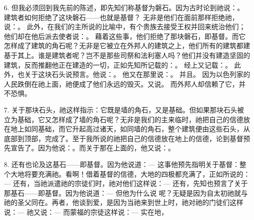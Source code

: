 6. 但我必须回到我先前的陈述，即先知们称基督为磐石。因为古时论到祂说：。建筑者如何拒绝了这块磐石——也就是基督？ 无非是他们在面前那样拒绝祂，说：。 此外，在我们的主所说的比喻中，有个贵族去接受王权并回来统治他们；他们却在他后派去使者说：。 藉着这些事，他们拒绝了那块磐石，即基督。而它怎样成了建筑的角石呢？无非是它被立在外邦人的建筑之上，他们所有的建筑都建基于其上。谁是建筑者呢？岂不是那些司祭和法利塞人吗？他们并没有建造坚固的建筑，反而推翻他正在建造的一切，正如先知所记载的：。 经上又记载：。 此外，也关于这块石头说预言。他说：。 他又在那里说：。 并且。 因为以色列家的人民跌倒在祂上面，祂便成了他们永远的毁灭。又说。 而外邦人却信赖了它，并不恐惧。\par

7. 关于那块石头，祂这样指示：它既是墙的角石，又是基础。但如果那块石头被立为基础，它又怎样成了墙的角石呢？无非是我们的主来临时，祂把自己的信德放在地上如同基础，而它升起高过诸天，如同墙的角石，整个建筑便由这些石头，从底部到顶部，完成了。至于我所说的祂把自己的信德放在地上的信德，论到基督预先宣告了。因为他说：。而关于那在上面的，他又说：。\par

8. 还有也论及这基石——即基督。因为他说道：—  这事他预先指明关于基督：整个大地将要充满祂。看啊！借着基督的信德，大地的四极都充满了，正如所说的：—  还有，当祂派遣祂的宗徒们时，祂对他们这样说：—  还有，先知也预言了关于那基石——即基督。因为他说道：—  但他为什么说  呢？无疑是因为自太初祂就与祂的圣父同在。再者，他谈到爱，是因为当祂来到世上时，祂对祂的门徒们这样说：—  祂又说：—  而蒙福的宗徒这样说：—  实在地，\par

